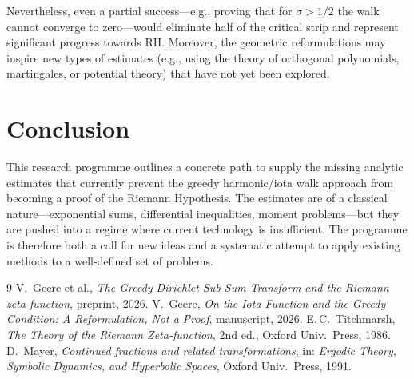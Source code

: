 \documentclass[11pt,a4paper]{article}
\begin{document}
Nevertheless, even a partial success—e.g., proving that for $\sigma>1/2$ the walk cannot converge to zero—would eliminate half of the critical strip and represent significant progress towards RH.  Moreover, the geometric reformulations may inspire new types of estimates (e.g., using the theory of orthogonal polynomials, martingales, or potential theory) that have not yet been explored.

\section{Conclusion}
This research programme outlines a concrete path to supply the missing analytic estimates that currently prevent the greedy harmonic/iota walk approach from becoming a proof of the Riemann Hypothesis.  The estimates are of a classical nature—exponential sums, differential inequalities, moment problems—but they are pushed into a regime where current technology is insufficient.  The programme is therefore both a call for new ideas and a systematic attempt to apply existing methods to a well‑defined set of problems.

\begin{thebibliography}{9}
 V.\ Geere et al., \textit{The Greedy Dirichlet Sub‑Sum Transform and the Riemann zeta function}, preprint, 2026.
 V.\ Geere, \textit{On the Iota Function and the Greedy Condition: A Reformulation, Not a Proof}, manuscript, 2026.
 E.\,C.\ Titchmarsh, \textit{The Theory of the Riemann Zeta‑function}, 2nd ed., Oxford Univ.\ Press, 1986.
 D.\ Mayer, \textit{Continued fractions and related transformations}, in: \textit{Ergodic Theory, Symbolic Dynamics, and Hyperbolic Spaces}, Oxford Univ.\ Press, 1991.
\end{thebibliography}
\end{document}
